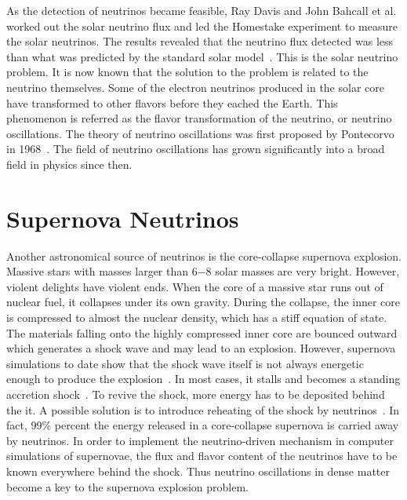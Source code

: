As the detection of neutrinos became feasible, Ray Davis and John Bahcall et al. worked out the solar neutrino flux and led the Homestake experiment to measure the solar neutrinos. The results revealed that the neutrino flux detected was less than what was predicted by the standard solar model~\cite{Bahcall1973}. This is the solar neutrino problem. It is now known that the solution to the problem is related to the neutrino themselves. Some of the electron neutrinos produced in the solar core have transformed to other flavors before they eached the Earth. This phenomenon is referred as the flavor transformation of the neutrino, or neutrino oscillations. The theory of neutrino oscillations was first proposed by Pontecorvo in 1968~\cite{Pontecorvo1968}. The field of neutrino oscillations has grown significantly into a broad field in physics since then.



\section{Supernova Neutrinos}


Another astronomical source of neutrinos is the core-collapse supernova explosion. Massive stars with masses larger than 6−8 solar masses are very bright. However, violent delights have violent ends. When the core of a massive star runs out of nuclear fuel, it collapses under its own gravity. During the collapse, the inner core is compressed to almost the nuclear density, which has a stiff equation of state. The materials falling onto the highly compressed inner core are bounced outward which generates a shock wave and may lead to an explosion. However, supernova simulations to date show that the shock wave itself is not always energetic enough to produce the explosion~\cite{Janka2016b}. In most cases, it stalls and becomes a standing accretion shock~\cite{Bethe1985r}. To revive the shock, more energy has to be deposited behind the it. A possible solution is to introduce reheating of the shock by neutrinos~\cite{Janka2016b}. In fact, 99\% percent the energy released in a core-collapse supernova is carried away by neutrinos.
In order to implement the neutrino-driven mechanism in computer simulations of supernovae, the flux and flavor content of the neutrinos have to be known everywhere behind the shock. Thus neutrino oscillations in dense matter become a key to the supernova explosion problem.

